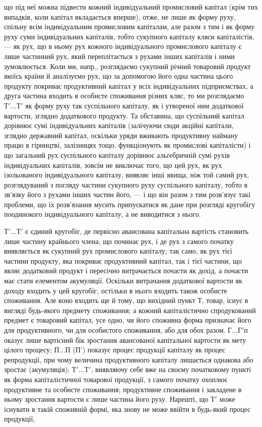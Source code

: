 \parcont{}  %
що під неї можна підвести кожний індивідуальний промисловий капітал (крім тих випадків, коли капітал
вкладається вперше), отже, не лише як форму руху, спільну всім індивідуальним промисловим капіталам,
але разом з тим і як форму руху суми індивідуальних капіталів, тобто сукупного капіталу кляси
капіталістів, — як рух, що в ньому рух кожного індивідуального промислового капіталу є лише
частинний рух, який переплітається з рухами інших капіталів і ними зумовлюється. Коли ми, напр.,
розглядаємо сукупний річний товаровий продукт якоїсь країни й аналізуємо рух, що за допомогою його
одна частина цього продукту покриває продуктивний капітал у всіх індивідуальних підприємствах, а
друга частина входить в особисте споживання різних кляс, то ми розглядаємо $Т'... Т'$ як форму руху
так суспільного капіталу, як і утвореної ним додаткової вартости, зглядно додаткового продукту. Та
обставина, що суспільний капітал дорівнює сумі індивідуальних капіталів (залічуючи сюди акційні
капітали, зглядно державний капітал, оскільки уряди вживають продуктивну найману працю в гірництві,
залізницях тощо, функціонують як промислові капіталісти) і що загальний рух суспільного капіталу
дорівнює альґебричній сумі рухів
індивідуальних капіталів, зовсім не виключає того, що цей рух, як рух ізольованого індивідуального
капіталу, виявляє інші явища, ніж той самий рух, розглядуваний з погляду частини сукупного руху
суспільного капіталу, тобто в зв’язку його з рухами інших частин його, — і що він разом з тим
розв’язує такі проблеми, що їх розв’язання мусить припускатися як дане при розгляді кругобігу
поодинокого індивідуального капіталу, а не виводитися з нього.

$Т'... Т'$ є єдиний кругобіг, де первісно авансована капітальна вартість становить лише частину
крайнього члена, що починає рух, і де рух з самого початку виявляється як сукупний рух промислового
капіталу; так само, як рух тієї частини продукту, яка покриває продуктивний капітал, так і тієї
частини, що являє додатковий продукт і пересічно витрачається почасти як дохід, а почасти має стати
елементом акумуляції. Оскільки витрачання додаткової вартости як доходу входить у цей кругобіг,
остільки в нього входить також особисте споживання. Але воно входить ще й тому, що вихідний пункт Т,
товар, існує в вигляді будь-якого предмету споживання; а кожний капіталістично спродукований предмет
є товаровий капітал, усе одно, чи його споживна форма призначає його для продуктивного, чи для
особистого споживання, або для обох разом. $Г... Г' п$оказує лише вартісний бік зростання авансованої
капітальної вартости як мету цілого процесу; $П... П$ (П') показує процес продукції капіталу як процес
репродукції, при чому величина продуктивного капіталу лишається однакова або зростає (акумуляція);
$Т'... Т'$, виявляючу себе вже на своєму початковому пункті як форма капіталістичної товарової
продукції, з самого початку охоплює продуктивне та особисте споживання; продуктивне споживання і
закладене в ньому зростання вартости є лише частина його руху. Нарешті, що $Т'$ може існувати в такій
споживній формі, яка знову не може ввійти в будь-який процес продукції,
\parbreak{}  %
